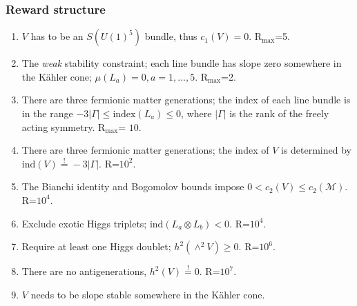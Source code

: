 \documentclass{beamer}
\begin{document}
\begin{frame}
\frametitle{Reward structure}
	\begin{enumerate}
	\item $V$ has to be an $S(U(1)^5)$ bundle, thus $c_1(V) = 0$. R$_{\text{max}}$=5. \label{c:sun}
	\item The \textit{weak} stability constraint; each line bundle has slope zero somewhere in the K\"ahler cone; $\mu(L_a)=0, a=1,...,5$. R$_{\text{max}}$=2. \label{c:weak}
	\item There are three fermionic matter generations; the index of each line bundle is in the range $-3 |\Gamma| \leq \text{index}(L_a) \leq 0$, where $|\Gamma|$ is the rank of the freely acting symmetry.  R$_{\text{max}}$= $10$. \label{c:index}
	\item There are three fermionic matter generations; the index of $V$ is determined by $\text{ind} (V) \stackrel{!}{=} -3 |\Gamma|$. R=$10^2$. \label{c:Index}
	\item The Bianchi identity and Bogomolov bounds impose $0 < c_2(V) \leq c_2 (\mathcal{M})$. R=$10^4$. \label{c:bianchi}
	\item Exclude exotic Higgs triplets; $\text{ind}(L_a \otimes L_b) < 0$. R=$10^4$.\label{c:triplet}
	\item Require at least one Higgs doublet; $h^2(\wedge^2 V) \geq 0$. 
	R=$10^6$.\label{c:doublet}
	\item There are no antigenerations, $h^2(V) \stackrel{!}{=} 0$. R=$10^7$.\label{c:fermion}
	\item $V$ needs to be slope stable somewhere in the K\"ahler cone. \label{c:kaehler}
\end{enumerate}
\end{frame}
\end{document}
